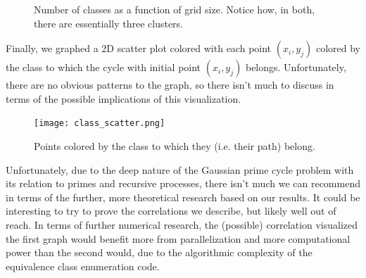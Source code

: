 \documentclass{article}
\begin{document}
\begin{figure}[H]

\caption{Number of classes as a function of grid size. Notice how, in both, there are essentially three clusters.}
\end{figure}

Finally, we graphed a 2D scatter plot colored with each point $(x_i, y_j)$ colored by the class to which the cycle with initial point $(x_i, y_j)$ belongs. Unfortunately, there are no obvious patterns to the graph, so there isn't much to discuss in terms of the possible implications of this visualization.

\begin{figure}[H]
\center
\texttt{[image: class\_scatter.png]}
\caption{Points colored by the class to which they (i.e. their path) belong.}
\end{figure}

Unfortunately, due to the deep nature of the Gaussian prime cycle problem with its relation to primes and recursive processes, there isn't much we can recommend in terms of the further, more theoretical research based on our results. It could be interesting to try to prove the correlations we describe, but likely well out of reach. In terms of further numerical research, the (possible) correlation visualized the first graph would benefit more from parallelization and more computational power than the second would, due to the algorithmic complexity of the equivalence class enumeration code.



\end{document}
